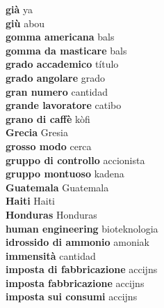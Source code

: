\textbf{ già  } ya \\
\textbf{ giù  } abou \\
\textbf{ gomma americana  } bals \\
\textbf{ gomma da masticare  } bals \\
\textbf{ grado accademico  } título \\
\textbf{ grado angolare  } grado \\
\textbf{ gran numero  } cantidad \\
\textbf{ grande lavoratore  } catibo \\
\textbf{ grano di caffè  } kòfi \\
\textbf{ Grecia  } Gresia \\
\textbf{ grosso modo  } cerca \\
\textbf{ gruppo di controllo  } accionista \\
\textbf{ gruppo montuoso  } kadena \\
\textbf{ Guatemala  } Guatemala \\
\textbf{ Haiti  } Haiti \\
\textbf{ Honduras  } Honduras \\
\textbf{ human engineering  } bioteknologia \\
\textbf{ idrossido di ammonio  } amoniak \\
\textbf{ immensità  } cantidad \\
\textbf{ imposta di fabbricazione  } accijns \\
\textbf{ imposta fabbricazione  } accijns \\
\textbf{ imposta sui consumi  } accijns \\
